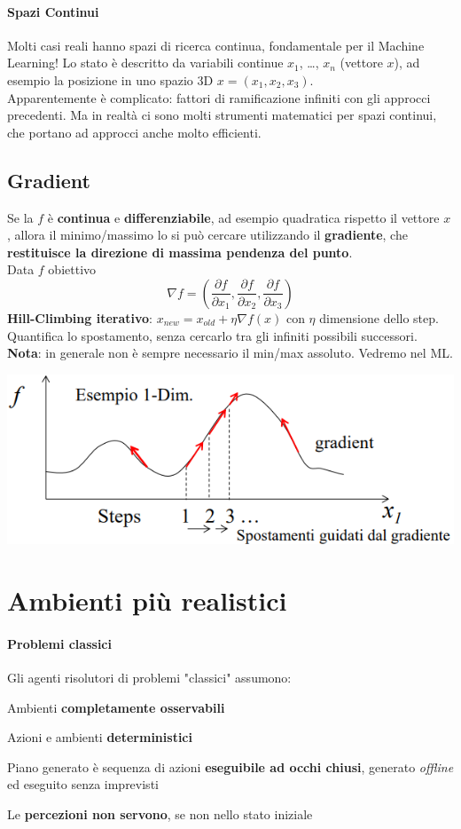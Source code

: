 \documentclass[10pt]{book}
\begin{document}
\paragraph{Spazi Continui} Molti casi reali hanno spazi di ricerca continua, fondamentale per il Machine Learning! Lo stato è descritto da variabili continue $x_1$, \ldots, $x_n$ (vettore $x$), ad esempio la posizione in uno spazio 3D $x = (x_1, x_2, x_3)$.\\
Apparentemente è complicato: fattori di ramificazione infiniti con gli approcci precedenti. Ma in realtà ci sono molti strumenti matematici per spazi continui, che portano ad approcci anche molto efficienti.
\subsection{Gradient}
Se la $f$ è \textbf{continua} e \textbf{differenziabile}, ad esempio quadratica rispetto il vettore $x$, allora il minimo/massimo lo si può cercare utilizzando il \textbf{gradiente}, che \textbf{restituisce la direzione di massima pendenza del punto}.\\
Data $f$ obiettivo $$\nabla f = \left( \frac{\partial f}{\partial x_1}, \frac{\partial f}{\partial x_2}, \frac{\partial f}{\partial x_3} \right)$$
\textbf{Hill-Climbing iterativo}: $x_{new} = x_{old} + \eta\nabla f(x)$ con $\eta$ dimensione dello step.\\
Quantifica lo spostamento, senza cercarlo tra gli infiniti possibili successori.\\
\textbf{Nota}: in generale non è sempre necessario il min/max assoluto. Vedremo nel ML.
\begin{center}
	\includegraphics[scale=1]{gradient.png}
\end{center}
\pagebreak
\section{Ambienti più realistici}
\paragraph{Problemi classici} Gli agenti risolutori di problemi "classici" assumono:
\begin{list}{}{}
	\item Ambienti \textbf{completamente osservabili}
	\item Azioni e ambienti \textbf{deterministici}
	\item Piano generato è sequenza di azioni \textbf{eseguibile ad occhi chiusi}, generato \textit{offline} ed eseguito senza imprevisti
	\item Le \textbf{percezioni non servono}, se non nello stato iniziale
\end{list}
\end{document}
